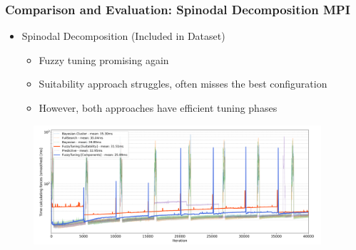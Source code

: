 \documentclass[
	10pt,
	t		%
]{beamer}
\begin{document}
\begin{frame}
	\frametitle{Comparison and Evaluation: Spinodal Decomposition MPI}

	\begin{itemize}
		\item Spinodal Decomposition (Included in Dataset)
		      \begin{itemize}
			      \item Fuzzy tuning promising again
			      \item Suitability approach struggles, often misses the best configuration
			      \item However, both approaches have efficient tuning phases
		      \end{itemize}
	\end{itemize}

	\begin{figure}
		\centering
		\includegraphics[width=0.95\textwidth]{figures/spinodal-timings.png}
	\end{figure}
\end{frame}
\end{document}
